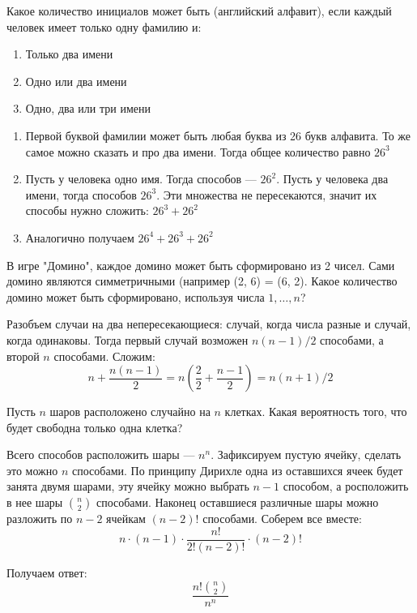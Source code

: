 \documentclass[document]{subfiles}
\begin{document}
\begin{problem}
    Какое количество инициалов может быть (английский алфавит), если каждый человек имеет только одну фамилию и:
    \begin{enumerate}
        \item Только два имени
        \item Одно или два имени
        \item Одно, два или три имени
    \end{enumerate}
\end{problem}
\begin{solution}
    \begin{enumerate}
        \item Первой буквой фамилии может быть любая буква из 26 букв алфавита. То же самое можно сказать и про два имени. Тогда общее количество равно $26^3$
        \item Пусть у человека одно имя. Тогда способов --- $26^2$. Пусть у человека два имени, тогда способов $26^3$. Эти множества не пересекаются, значит их способы нужно сложить: $26^3 + 26^2$
        \item Аналогично получаем $26^4 + 26^3 + 26^2$
    \end{enumerate}
\end{solution} 

\begin{problem}
    В игре "Домино", каждое домино может быть сформировано из 2 чисел. Сами домино являются симметричными (например (2, 6) = (6, 2).
    Какое количество домино может быть сформировано, используя числа $1, \dots, n$?
\end{problem}
\begin{solution}
    Разобъем случаи на два непересекающиеся: случай, когда числа разные и случай, когда одинаковы. Тогда первый случай возможен $n(n-1)/2$ способами, а второй $n$ способами. Сложим:
    \[n + \frac{n(n-1)}{2} = n\left(\frac{2}{2} + \frac{n-1}{2}\right) = n(n+1)/2\]
\end{solution}

\begin{problem}
    Пусть $n$ шаров расположено случайно на $n$ клетках. Какая вероятность того, что будет свободна только одна клетка?
\end{problem}
\begin{solution}
    Всего способов расположить шары --- $n^n$. Зафиксируем пустую ячейку, сделать это можно $n$ способами. По принципу Дирихле одна из оставшихся ячеек будет занята двумя шарами, эту ячейку можно выбрать $n-1$ способом, а росположить в нее шары $\binom{n}{2}$ способами. Наконец оставшиеся различные шары можно разложить по $n-2$ ячейкам $(n-2)!$ способами. Соберем все вместе:
    \[n \cdot (n-1) \cdot \frac{n!}{2! (n-2)!} \cdot (n-2)!\]

    Получаем ответ:
    \[\frac{n! \binom{n}{2}}{n^n}\]
\end{solution}
\end{document}
